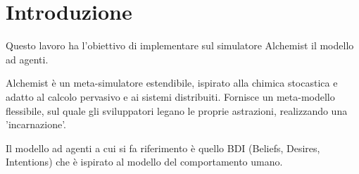 \documentclass[12pt,a4paper,openright,twoside]{report}
\begin{document}
\begin{titlepage}

\thispagestyle{empty}

\topmargin=6.5cm

\raggedleft

\large

\em


\newpage

\clearpage{\pagestyle{empty}\cleardoublepage}
\end{titlepage}

\chapter*{Introduzione} %


Questo lavoro ha l'obiettivo di implementare sul simulatore Alchemist il modello ad agenti.

Alchemist \`e un meta-simulatore estendibile, ispirato alla chimica stocastica e adatto al calcolo pervasivo e ai sistemi distribuiti. Fornisce un meta-modello flessibile, sul quale gli sviluppatori legano le proprie astrazioni, realizzando una 'incarnazione'.

Il modello ad agenti a cui si fa riferimento \`e quello BDI (Beliefs, Desires, Intentions) che \`e ispirato al modello del comportamento umano.


\clearpage{\pagestyle{empty}\cleardoublepage}

\tableofcontents

\rhead[\fancyplain{}{\bfseries\leftmark}]{\fancyplain{}{\bfseries\thepage}}
\end{document}
